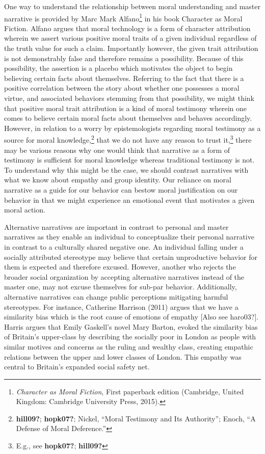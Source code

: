 \documentclass[
  12pt,
]{book}
\theoremstyle{definition}
\theoremstyle{definition}
\theoremstyle{definition}
\theoremstyle{definition}
\theoremstyle{remark}
\begin{document}
One way to understand the relationship between moral understanding and master narrative is provided by Marc Mark Alfano\footnote{\emph{Character as Moral Fiction}, First paperback edition (Cambridge, United Kingdom: Cambridge University Press, 2015).} in his book Character as Moral Fiction. Alfano argues that moral technology is a form of character attribution wherein we assert various positive moral traits of a given individual regardless of the truth value for such a claim. Importantly however, the given trait attribution is not demonstrably false and therefore remains a possibility. Because of this possibility, the assertion is a placebo which motivates the object to begin believing certain facts about themselves. Referring to the fact that there is a positive correlation between the story about whether one possesses a moral virtue, and associated behaviors stemming from that possibility, we might think that positive moral trait attribution is a kind of moral testimony wherein one comes to believe certain moral facts about themselves and behaves accordingly. However, in relation to a worry by epistemologists regarding moral testimony as a source for moral knowledge,\footnote{\textbf{hill09?}; \textbf{hopk07?}; Nickel, {``Moral {Testimony} and Its {Authority}''}; Enoch, {``A {Defense} of {Moral Deference}.''}} that we do not have any reason to trust it,\footnote{E.g., see \textbf{hopk07?}; \textbf{hill09?}} there may be various reasons why one would think that narrative as a form of testimony is sufficient for moral knowledge whereas traditional testimony is not. To understand why this might be the case, we should contrast narratives with what we know about empathy and group identity. Our reliance on moral narrative as a guide for our behavior can bestow moral justification on our behavior in that we might experience an emotional event that motivates a given moral action.

Alternative narratives are important in contrast to personal and master narratives as they enable an individual to conceptualize their personal narrative in contrast to a culturally shared negative one. An individual falling under a socially attributed stereotype may believe that certain unproductive behavior for them is expected and therefore excused. However, another who rejects the broader social organization by accepting alternative narratives instead of the master one, may not excuse themselves for sub-par behavior. Additionally, alternative narratives can change public perceptions mitigating harmful stereotypes. For instance, Catherine Harrison (2011) argues that we have a similarity bias which is the root cause of emotions of empathy {[}Also see haro03?{]}. Harris argues that Emily Gaskell's novel Mary Barton, evoked the similarity bias of Britain's upper-class by describing the socially poor in London as people with similar motives and concerns as the ruling and wealthy class, creating empathic relations between the upper and lower classes of London. This empathy was central to Britain's expanded social safety net.
\end{document}
